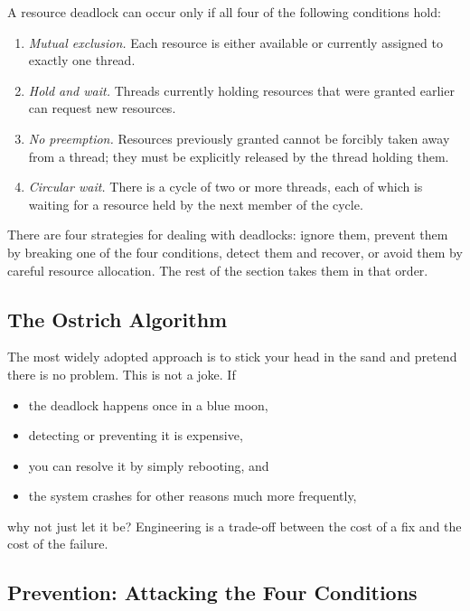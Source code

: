 \begin{keypoint}
  \label{kp:deadlockcond}
  A resource deadlock can occur only if all four of the following conditions hold:
  \begin{enumerate}
    \item \emph{Mutual exclusion.} Each resource is either available or currently assigned to exactly one thread.
    \item \emph{Hold and wait.} Threads currently holding resources that were granted earlier can request new resources.
    \item \emph{No preemption.} Resources previously granted cannot be forcibly taken away from a thread; they must be explicitly released by the thread holding them.
    \item \emph{Circular wait.} There is a cycle of two or more threads, each of which is waiting for a resource held by the next member of the cycle.
  \end{enumerate}
\end{keypoint}

There are four strategies for dealing with deadlocks: ignore them, prevent them by breaking one of the four conditions, detect them and recover, or avoid them by careful resource allocation. The rest of the section takes them in that order.

\subsection{The Ostrich Algorithm}

The most widely adopted approach is to stick your head in the sand and pretend there is no problem. This is not a joke. If
\begin{itemize}
  \item the deadlock happens once in a blue moon,
  \item detecting or preventing it is expensive,
  \item you can resolve it by simply rebooting, and
  \item the system crashes for other reasons much more frequently,
\end{itemize}
why not just let it be? Engineering is a trade-off between the cost of a fix and the cost of the failure.

\subsection{Prevention: Attacking the Four Conditions}

